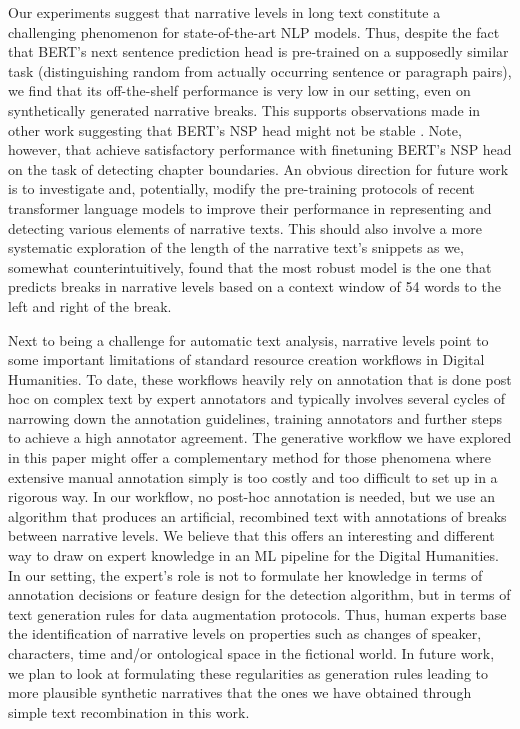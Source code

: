 \documentclass[10pt, a4paper]{article}
\begin{document}
Our experiments suggest that narrative levels in long text constitute a challenging phenomenon for state-of-the-art NLP models.
Thus, despite the fact that BERT's next sentence prediction head is pre-trained on a supposedly similar task (distinguishing random from actually occurring sentence or paragraph pairs), we find that its off-the-shelf performance is very low in our setting, even on synthetically generated narrative breaks. 
This supports observations made in other work suggesting that BERT's NSP head might not be stable \cite{liu2019roberta}. 
Note, however, that \cite{pethe-etal-2020-chapter} achieve satisfactory performance with finetuning  BERT's NSP head on the task of detecting chapter boundaries.
An obvious direction for future work is to investigate and, potentially, modify the pre-training protocols of recent transformer language models to improve their performance in representing and detecting various elements of narrative texts.
This should also involve a more systematic exploration of the length of the narrative text's snippets as we, somewhat counterintuitively, found that the most robust model is the one that predicts breaks in narrative levels based on a context window of 54 words to the left and right of the break.

Next to being a challenge for automatic text analysis, narrative levels point to some important limitations of  standard resource creation workflows in Digital Humanities.
To date, these workflows heavily rely on  annotation that is done post hoc on complex text by expert annotators and typically involves several cycles of narrowing down the annotation guidelines, training annotators and further steps to achieve a high annotator agreement.
The generative workflow we have explored in this paper might offer a complementary method for those phenomena where extensive manual annotation simply is too costly  and too difficult to set up in a rigorous way.
In our workflow, no post-hoc annotation is needed, but we use an algorithm that produces an artificial, recombined text with annotations of breaks between narrative levels.
We believe that this offers an interesting and different way to draw on expert knowledge in an ML pipeline for the Digital Humanities. In our setting, the expert's role is not to formulate her knowledge in terms of annotation decisions or feature design for the detection algorithm, but in terms of text generation rules for data augmentation protocols.
Thus, human experts base the identification of narrative levels on properties such as changes of speaker, characters, time and/or ontological space in the fictional world. 
In future work, we plan to look at formulating these regularities as generation rules leading to more plausible synthetic narratives that the ones we have obtained through simple text recombination in this work.
\end{document}

